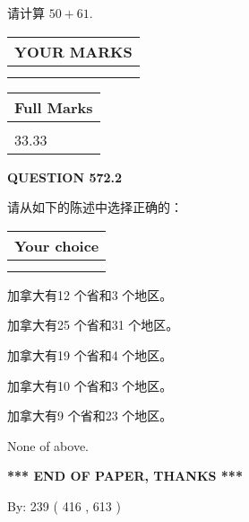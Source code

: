 \documentclass{ctexart}
\begin{document}
  
 
请计算 $ %
50 +  %
61 $.
 

 

 
  
\vspace{0.2in}
  
\noindent\begin{tabular}{|l|}
\hline
 YOUR MARKS  \\
\hline
 \\ 
 \\ 
\hline
\end{tabular}
\hspace{0.05in} \begin{tabular}{|l|}
\hline
 Full Marks  \\
\hline
 \\ 
33.33 \\
\hline
\end{tabular}
{\textbf{\Large{QUESTION
572.2 
}}}
  
  
请从如下的陈述中选择正确的：
  
  
\noindent\hspace{3.0in} \begin{tabular}{|l|}
\hline
Your choice \\
\hline
 \\ 
 \\ 
\hline
\end{tabular}
  
  
 
 
加拿大有12 个省和3 个地区。
 
 
加拿大有25 个省和31 个地区。
 
 
加拿大有19 个省和4 个地区。
 
 
加拿大有10 个省和3 个地区。
 
 
加拿大有9 个省和23 个地区。
 
 
 None of above.
 
 
   
   
 \vspace{0.2in}
 
   
   
   
   
\vspace{1.0in} 
{\textbf{\large{ *** END OF PAPER, THANKS *** }}} 
   
   
\hspace{1.0in} By: 
 239 ( 416 ,  613 )
   
\end{document}

